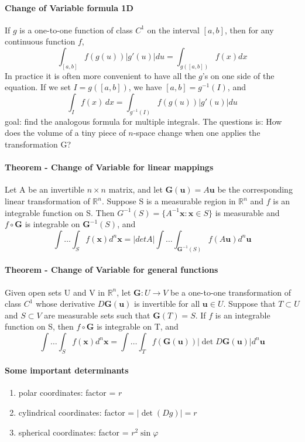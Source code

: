 \documentclass[11pt]{article}
\newcommand{\tb}[1]{\textbf{#1}}
\newcommand{\real}[0]{\mathbb{R}}
\newcommand{\func}[3]{\tb{#1}: {#2} \rightarrow {#3} }
\newcommand{\vx}[0]{\tb{x}}
\begin{document}
\paragraph{Change of Variable formula 1D} If $g$ is a one-to-one function of class $C^1$ on the interval $[a, b]$, then for any continuous function $f$,
$$\int_{[a,b]} f(g(u))|g'(u)|du = \int_{g([a,b])}f(x)dx$$
In practice it is often more convenient to have all the $g$'s on one side of the equation. If we set $I = g([a, b])$, we have $[a, b] = g^{-1}(I)$, and
$$\int_I f(x) \, dx = \int_{g^{-1}(I)}f(g(u))|g'(u)|du$$
goal: find the analogous formula for multiple integrals. The questions is: How does the volume of a tiny piece of $n$-space change when one applies the transformation G?
\paragraph{Theorem - Change of Variable for linear mappings} Let A be an invertible $n \times n$ matrix, and let $\tb{G}(\tb{u}) = A\tb{u}$ be the corresponding linear transformation of $\real^n$. Suppose S is a measurable region in $\real^n$ and $f$ is an integrable function on S. Then $G^{-1}(S) = \{A^{-1}\tb{x}: \tb{x} \in S\}$ is measurable and $f \circ \tb{G}$ is integrable on $\tb{G}^{-1}(S)$, and
    $$ \int \hdots \int_S f(\vx)d^n\vx = |det A| \int \hdots \int_{\tb{G}^{-1}(S)}f(A\tb{u})d^n\tb{u}$$

\paragraph{Theorem - Change of Variable for general functions} Given open sets U and V in $\real^n$, let $\func{G}{U}{V}$ be a one-to-one transformation of class $C^1$ whose derivative $D\tb{G}(\tb{u})$ is invertible for all $\tb{u} \in U$. Suppose that $T \subset U$ and $S \subset V$ are measurable sets such that $\tb{G}(T) = S$. If $f$ is an integrable function on S, then $f \circ \tb{G}$ is integrable on T, and 
    $$ \int \hdots \int_S f(\vx)d^n\vx = \int \hdots \int_{T}f(\tb{G}(\tb{u}))|\det D\tb{G}(\tb{u})|d^n\tb{u}$$
    
\paragraph{Some important determinants}
\begin{enumerate}
    \item polar coordinates: factor = $r$
    \item cylindrical coordinates: factor = $|\det(Dg)| = r$
    \item spherical coordinates: factor = $r^2\sin\varphi$
\end{enumerate}
\end{document}
